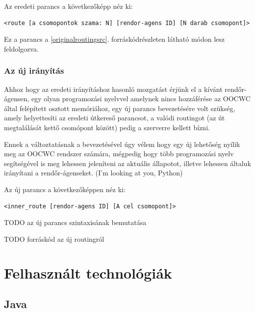 \documentclass[a4paper,12pt]{report}
\begin{document}
\vspace{2mm}
Az eredeti parancs a következőképp néz ki: 
\begin{lstlisting}
<route [a csomopontok szama: N] [rendor-agens ID] [N darab csomopont]>
\end{lstlisting}

Ez a parancs a \ref{originalroutingsrc}. forráskódrészleten látható módon lesz feldolgozva.



\subsection{Az új irányítás}
\label{newrouting}

Ahhoz hogy az eredeti irányításhoz hasonló mozgatást érjünk el a kívánt rendőr-ágensen, egy olyan programozási nyelvvel amelynek nincs hozzáférése az OOCWC által felépített osztott memóriához, egy új parancs bevezetésére volt szükség, amely helyettesíti az eredeti útkereső parancsot, a valódi routingot (az út megtalálását kettő csomópont között) pedig a szerverre kellett bízni.

\vspace{2mm}
Ennek a változtatásnak a bevezetésével úgy vélem hogy egy új lehetőség nyílik meg az OOCWC rendszer számára, mégpedig hogy több programozási nyelv segítségével is meg lehessen jeleníteni az aktuális állapotot, illetve lehessen általuk irányítani a rendőr-ágenseket. (I'm looking at you, Python)

\vspace{2mm}
Az új parancs a következőképpen néz ki:
\begin{lstlisting}
<inner_route [rendor-agens ID] [A cel csomopont]>
\end{lstlisting}

TODO az új parancs szintaxisának bemutatása

TODO forráskód az új routingról

\newpage
\chapter{Felhasznált technológiák}
\label{technologies}

\section{Java}
\label{java}
\end{document}
